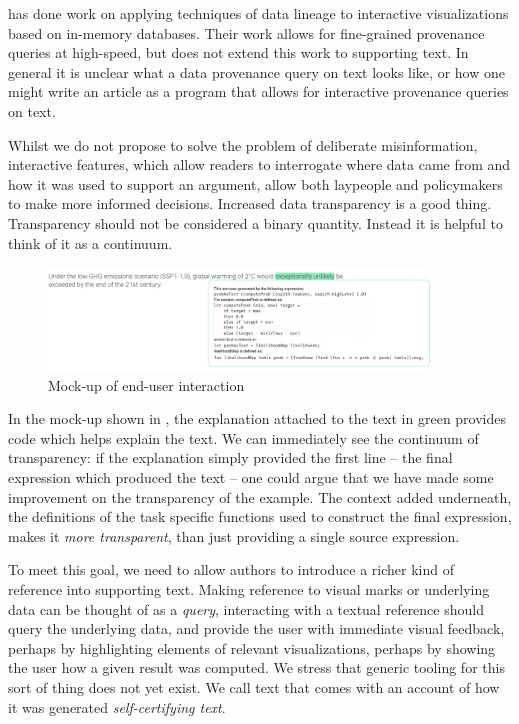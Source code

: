 \cite{psallidas18} has done work on applying techniques of data lineage to interactive
visualizations based on in-memory databases. Their work allows for fine-grained
provenance queries at high-speed, but does not extend this work to supporting text.
In general it is unclear what a data provenance query on text looks like, or how one
might write an article as a program that allows for interactive provenance queries on text.

Whilst we do not propose to solve the problem of deliberate misinformation,
interactive features, which allow readers to interrogate where data came from and how
it was used to support an argument, allow both laypeople and policymakers to make more
informed decisions. Increased data transparency is a good thing. Transparency
should not be considered a binary quantity. Instead it is helpful to think of it as a continuum.

\begin{figure}
   \includegraphics[width=0.9\textwidth]{fig/table-spm-fluid-mockup.png}
   \caption{Mock-up of end-user interaction}
   \label{fig:table-mockup}
\end{figure}

In the mock-up shown in , the explanation attached to the text in
green provides code which helps explain the text. We can immediately see the continuum of
transparency: if the explanation simply provided the first line -- the final expression which
produced the text -- one could argue that we have made some improvement on the transparency
of the example. The context added underneath, the definitions of the task specific functions
used to construct the final expression, makes it \emph{more transparent}, than just 
providing a single source expression.


To meet this goal, we need to allow authors to introduce a richer kind of reference into supporting
text. Making reference to visual marks or underlying data can be thought of as a \emph{query},
interacting with a textual reference should query the underlying data, and provide the user with immediate
visual feedback, perhaps by highlighting elements of relevant visualizations, perhaps by showing the user
how a given result was computed. We stress that generic tooling for this sort of thing does not yet exist.
We call text that comes with an account of how it was generated \emph{self-certifying text}.

